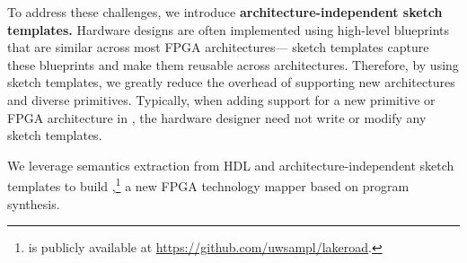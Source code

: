 
 
To address these challenges, 
  we introduce
  \textbf{architecture-independent sketch templates.}
Hardware designs are often implemented
  using high-level blueprints that are similar 
  across most FPGA architectures---%
  sketch templates
  capture these blueprints
  and make them reusable across architectures.
Therefore, by using sketch templates, we
  greatly reduce the overhead of supporting
  new architectures and
  diverse primitives.
Typically, when adding support for
  a new primitive or FPGA architecture in \lr,
  the hardware designer
  need not write or modify
  any sketch templates.





We leverage
  semantics extraction
  from HDL
  and architecture-independent
  sketch templates
  to build \lr,\footnote{
  \lr is publicly available at
  \url{https://github.com/uwsampl/lakeroad}.
  }
  a new FPGA technology mapper
  based on program synthesis.
  
